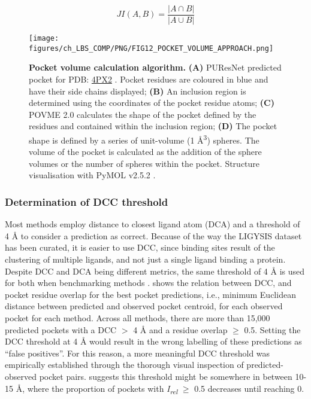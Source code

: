 \begin{equation}
JI(A, B) = \frac{|A \cap B|}{|A \cup B|}
\label{eq:jaccard_index}
\end{equation}

\begin{figure}[h]
    \centering
    \texttt{[image: figures/ch\_LBS\_COMP/PNG/FIG12\_POCKET\_VOLUME\_APPROACH.png]}
    \caption[Pocket volume calculation algorithm]{\textbf{Pocket volume calculation algorithm.} \textbf{(A)} PUResNet predicted pocket for PDB: \href{https://www.ebi.ac.uk/pdbe/entry/pdb/4PX2}{4PX2} \cite{PDB_4PX2}. Pocket residues are coloured in blue and have their side chains displayed; \textbf{(B)} An inclusion region is determined using the coordinates of the pocket residue atoms; \textbf{(C)} POVME 2.0 calculates the shape of the pocket defined by the residues and contained within the inclusion region; \textbf{(D)} The pocket shape is defined by a series of unit-volume (1 \AA{}\textsuperscript{3}) spheres. The volume of the pocket is calculated as the addition of the sphere volumes or the number of spheres within the pocket. Structure visualisation with PyMOL v2.5.2 \cite{SCHRODINGER_2015_PYMOL}.}
    \label{fig:protein_volume_approach}
\end{figure}

\vspace{-12pt} %
\vspace{-12pt} %

\subsubsection{Determination of DCC threshold}

Most methods employ distance to closest ligand atom  (DCA) and a threshold of 4 \AA{} to consider a prediction as correct. Because of the way the LIGYSIS dataset has been curated, it is easier to use DCC, since binding sites result of the clustering of multiple ligands, and not just a single ligand binding a protein. Despite DCC and DCA being different metrics, the same threshold of 4 \AA{} is used for both when benchmarking methods \cite{AGGARWAL_2022_DEEPPOCKET, SESTAK_2024_VNEGNN, KANDEL_2021_PURESNET}.  shows the relation between DCC, and pocket residue overlap for the best pocket predictions, i.e., minimum Euclidean distance between predicted and observed pocket centroid, for each observed pocket for each method. Across all methods, there are more than 15,000 predicted pockets with a DCC $>$ 4 \AA{} and a residue overlap $\geq$ 0.5. Setting the DCC threshold at 4 \AA{} would result in the wrong labelling of these predictions as ``false positives''. For this reason, a more meaningful DCC threshold was empirically established through the thorough visual inspection of predicted-observed pocket pairs.  suggests this threshold might be somewhere in between 10-15 \AA{}, where the proportion of pockets with \textit{I\textsubscript{rel}} $\geq$ 0.5 decreases until reaching 0.


